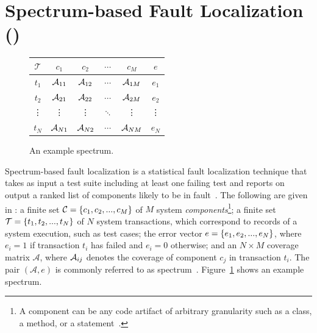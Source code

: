\documentclass{article}
\begin{document}
\section{Spectrum-based Fault Localization (\sfl)}
\label{sec:sfl}

\begin{figure}
  \hspace{-2ex}
  \centering
  \scriptsize
  \setlength{\tabcolsep}{3.5pt}
  \begin{tabular}{c|cccc|c}
    $\mathcal{T}$ & $c_1$    & $c_2$    & $\cdots$ & $c_M$    & $e$    \\ \hline
    $t_1$         & $\mathcal{A}_{11}$ & $\mathcal{A}_{12}$ & $\cdots$ & $\mathcal{A}_{1M}$ & $e_1$  \\
    $t_2$         & $\mathcal{A}_{21}$ & $\mathcal{A}_{22}$ & $\cdots$ & $\mathcal{A}_{2M}$ & $e_2$  \\
    \vdots        & \vdots   & \vdots   & $\ddots$ & \vdots   & \vdots \\
    $t_N$         & $\mathcal{A}_{N1}$ & $\mathcal{A}_{N2}$ & $\cdots$ & $\mathcal{A}_{NM}$ & $e_N$  \\
  \end{tabular}
  \caption{An example spectrum.}
  \label{fig:spectrum-example}
\end{figure}

Spectrum-based fault localization is a statistical fault
localization technique that takes as input a test suite including at
least one failing test and reports on output a ranked list of
components likely to be in
fault~\cite{7390282,DBLP:conf/kbse/JonesH05,DBLP:journals/smr/LuciaLJTB14,DBLP:journals/jss/AbreuZGG09}. The
following are given in \sfl{}: a finite set $\mathcal{C}=\{{}c_1,c_2,...,c_M\}$
of $M$ system \emph{components}\footnote{A component can be any code artifact of arbitrary granularity
such as a class, a method, or a statement~\cite{DBLP:journals/stvr/HarroldRSWY00}.};
a finite set $\mathcal{T} = \{{}t_1,t_2,...,t_N\}$ of $N$ system transactions,
which correspond to records of a system execution, such as test cases;
the error vector $e = \{{}e_1,e_2,...,e_N\}$, where $e_i = 1$ if
transaction $t_i$ has failed and $e_i = 0$ otherwise; and an
$N\times{}M$ coverage matrix $\mathcal{A}$, where $\mathcal{A}_{ij}$ denotes the
coverage of component $c_j$ in transaction $t_i$.  The pair
$(\mathcal{A},e)$ is commonly referred to as
spectrum~\cite{DBLP:journals/stvr/HarroldRSWY00}. Figure~\ref{fig:spectrum-example}
shows an example spectrum.
\end{document}
